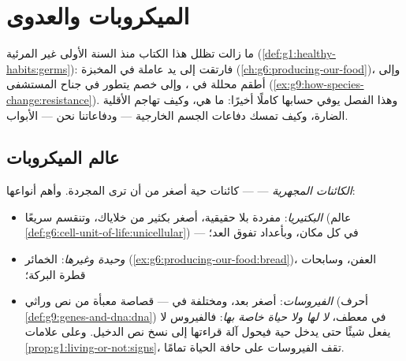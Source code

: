 \chapter{الميكروبات والعدوى}\label{ch:g9:microbes-and-infection}

ما زالت تظلل هذا الكتاب منذ  السنة الأولى غير
المرئية (\cref{def:g1:healthy-habits:germs}): فارتقت إلى
يد عاملة في المخبزة (\cref{ch:g6:producing-our-food})،
وإلى أطقم محللة في ، وإلى خصم يتطور في جناح
المستشفى (\cref{ex:g9:how-species-change:resistance}).
وهذا الفصل يوفي  حسابها كاملًا أخيرًا: ما هي،
وكيف تهاجم الأقلية الضارة، وكيف تمسك دفاعات الجسم
الخارجية --- ودفاعاتنا نحن --- الأبواب.

\section{عالم الميكروبات}

\begin{definition}\label{def:g9:microbes-and-infection:sorted}
\emph{الكائنات المجهرية} ---
 --- كائنات حية أصغر من أن ترى  المجردة.
وأهم أنواعها:
\begin{itemize}
  \item \emph{البكتيريا}:  مفردة بلا
         حقيقية، أصغر بكثير من خلاياك، وتنقسم سريعًا
        (عالم
        \cref{def:g6:cell-unit-of-life:unicellular}) ---
        في كل مكان، وبأعداد تفوق العد؛
  \item \emph{ وحيدة  وغيرها}: الخمائر
        (\cref{ex:g6:producing-our-food:bread})، 
        العفن، وسابحات قطرة البركة؛
  \item \emph{الفيروسات}: أصغر بعد، ومختلفة
        في  --- قصاصة معبأة من نص وراثي (أحرف
        \cref{def:g9:genes-and-dna:dna}) في معطف، \emph{لا
         لها ولا حياة خاصة بها}: فالفيروس لا يفعل
        شيئًا حتى يدخل  حية فيحول آلة قراءتها إلى نسخ
        نص الدخيل. وعلى علامات
        \cref{prop:g1:living-or-not:signs}، تقف الفيروسات
        على حافة الحياة تمامًا.
\end{itemize}
\end{definition}

